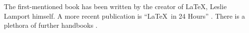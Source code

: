 The first-mentioned book \citep{lamport1994} has been written by the creator of \LaTeX{}, Leslie Lamport himself. A more recent publication is \enquote{\LaTeX\ in 24 Hours} \citep{datta2017}. There is a plethora of further handbooks \citep*[e.\,g.,][]{goossensmittelbach2002}.


